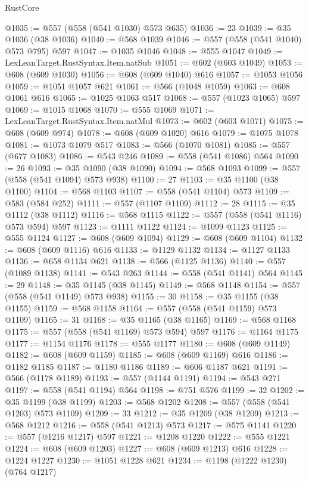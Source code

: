 \begin{lexlean}{RustCore}
\begin{coremodule}
@1035 := @557 (@558 (@541 @1030) @573 @635)
@1036 := 23
@1039 := @35 @1036 (@38 @1036)
@1040 := @568 @1039
@1046 := @557 (@558 (@541 @1040) @573 @795) @597
@1047 := @1035 @1046
@1048 := @555 @1047
@1049 := LexLeanTarget.RustSyntax.Item.natSub
@1051 := @602 (@603 @1049)
@1053 := @608 (@609 @1030)
@1056 := @608 (@609 @1040) @616
@1057 := @1053 @1056
@1059 := @1051 @1057 @621
@1061 := @566 (@1048 @1059)
@1063 := @608 @1061 @616
@1065 := @1025 @1063 @517
@1068 := @557 (@1023 @1065) @597
@1069 := @1015 @1068
@1070 := @555 @1069
@1071 := LexLeanTarget.RustSyntax.Item.natMul
@1073 := @602 (@603 @1071)
@1075 := @608 (@609 @974)
@1078 := @608 (@609 @1020) @616
@1079 := @1075 @1078
@1081 := @1073 @1079 @517
@1083 := @566 (@1070 @1081)
@1085 := @557 (@677 @1083)
@1086 := @543 @246
@1089 := @558 (@541 @1086) @564
@1090 := 26
@1093 := @35 @1090 (@38 @1090)
@1094 := @568 @1093
@1099 := @557 (@558 (@541 @1094) @573 @938)
@1100 := 27
@1103 := @35 @1100 (@38 @1100)
@1104 := @568 @1103
@1107 := @558 (@541 @1104) @573
@1109 := @583 (@584 @252)
@1111 := @557 (@1107 @1109)
@1112 := 28
@1115 := @35 @1112 (@38 @1112)
@1116 := @568 @1115
@1122 := @557 (@558 (@541 @1116) @573 @594) @597
@1123 := @1111 @1122
@1124 := @1099 @1123
@1125 := @555 @1124
@1127 := @608 (@609 @1094)
@1129 := @608 (@609 @1104)
@1132 := @608 (@609 @1116) @616
@1133 := @1129 @1132
@1134 := @1127 @1133
@1136 := @658 @1134 @621
@1138 := @566 (@1125 @1136)
@1140 := @557 (@1089 @1138)
@1141 := @543 @263
@1144 := @558 (@541 @1141) @564
@1145 := 29
@1148 := @35 @1145 (@38 @1145)
@1149 := @568 @1148
@1154 := @557 (@558 (@541 @1149) @573 @938)
@1155 := 30
@1158 := @35 @1155 (@38 @1155)
@1159 := @568 @1158
@1164 := @557 (@558 (@541 @1159) @573 @1109)
@1165 := 31
@1168 := @35 @1165 (@38 @1165)
@1169 := @568 @1168
@1175 := @557 (@558 (@541 @1169) @573 @594) @597
@1176 := @1164 @1175
@1177 := @1154 @1176
@1178 := @555 @1177
@1180 := @608 (@609 @1149)
@1182 := @608 (@609 @1159)
@1185 := @608 (@609 @1169) @616
@1186 := @1182 @1185
@1187 := @1180 @1186
@1189 := @606 @1187 @621
@1191 := @566 (@1178 @1189)
@1193 := @557 (@1144 @1191)
@1194 := @543 @271
@1197 := @558 (@541 @1194) @564
@1198 := @751 @576
@1199 := 32
@1202 := @35 @1199 (@38 @1199)
@1203 := @568 @1202
@1208 := @557 (@558 (@541 @1203) @573 @1109)
@1209 := 33
@1212 := @35 @1209 (@38 @1209)
@1213 := @568 @1212
@1216 := @558 (@541 @1213) @573
@1217 := @575 @1141
@1220 := @557 (@1216 @1217) @597
@1221 := @1208 @1220
@1222 := @555 @1221
@1224 := @608 (@609 @1203)
@1227 := @608 (@609 @1213) @616
@1228 := @1224 @1227
@1230 := @1051 @1228 @621
@1234 := @1198 (@1222 @1230) (@764 @1217)

\end{coremodule}
\end{lexlean}
